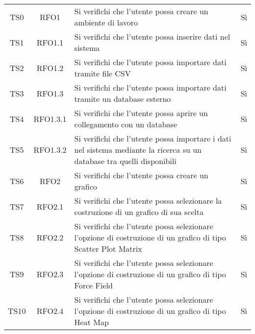 \documentclass[../piano_di_qualifica.tex]{subfiles}
\begin{document}
\begin{center}
\begin{longtable}{|c|c|p{8cm}|c|}
		TS0               & RFO1                   & Si verifichi che l'utente possa creare un ambiente di lavoro                                                              & Sì                         \\
		TS1               & RFO1.1                 & Si verifichi che l'utente possa inserire dati nel sistema                                                                 & Sì                         \\
		TS2               & RFO1.2                 & Si verifichi che l'utente possa importare dati tramite file CSV                                                           & Sì                         \\
		TS3               & RFO1.3                 & Si verifichi che l'utente possa importare dati tramite un database esterno                                                & Sì                         \\
		TS4               & RFO1.3.1               & Si verifichi che l'utente possa aprire un collegamento con un database                                                    & Sì                         \\
		TS5               & RFO1.3.2               & Si verifichi che l'utente possa importare i dati nel sistema mediante la ricerca su un database tra quelli disponibili    & Sì                         \\
		TS6               & RFO2                   & Si verifichi che l'utente possa creare  un grafico                                                                        & Sì                         \\
		TS7               & RFO2.1                 & Si verifichi che l'utente possa selezionare la costruzione di un grafico di sua scelta                                    & Sì                         \\
		TS8               & RFO2.2                 & Si verifichi che l'utente possa selezionare l'opzione di costruzione di un grafico di tipo Scatter Plot Matrix            & Sì                         \\
		TS9               & RFO2.3                 & Si verifichi che l'utente possa selezionare l'opzione di costruzione di un grafico di tipo Force Field                    & Sì                         \\
		TS10              & RFO2.4                 & Si verifichi che l'utente possa selezionare l'opzione di costruzione di un grafico di tipo Heat Map                       & Sì                         \\

\end{longtable}
\end{center}
\end{document}
